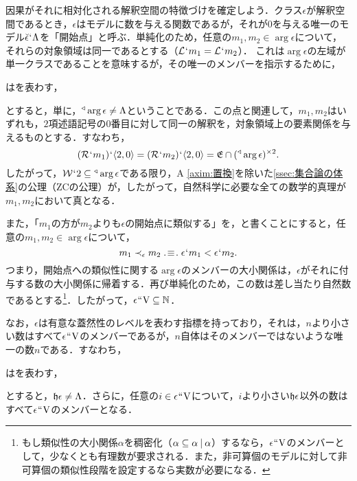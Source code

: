 因果がそれに相対化される解釈空間の特徴づけを確定しよう．クラス$\epsilon$が解釈空間であるとき，$\epsilon$はモデルに数を与える関数であるが，それが$0$を与える唯一のモデル$\breve{\epsilon}{\mspace{1mu}{`}\mspace{1mu}} \Lambda$を「開始点」と呼ぶ．単純化のため，任意の$m_1,m_2\in\arg\epsilon$について，それらの対象領域は同一であるとする（$\mathcal{L}{\mspace{1mu}{`}\mspace{1mu}} m_1 = \mathcal{L}{\mspace{1mu}{`}\mspace{1mu}} m_2$）．
これは$\arg\epsilon$の左域が単一クラスであることを意味するが，その唯一のメンバーを指示するために，
\begin{df}
\label{df:トライアングル}
\kagi{$
    \trgl{\alpha}
$}はを表わす，
\end{df}
\noindent とすると，単に，$ {^\triangleleft}\arg\epsilon\neq \Lambda $ということである．この点と関連して，$m_1,m_2$はいずれも，$2$項述語記号の$0$番目に対して同一の解釈を，対象領域上の要素関係を与えるものとする．すなわち，
\[
    (\mathcal{R}{\mspace{1mu}{`}\mspace{1mu}} m_1){\mspace{1mu}{`}\mspace{1mu}} \langle 2,0 \rangle = (\mathcal{R}{\mspace{1mu}{`}\mspace{1mu}} m_2){\mspace{1mu}{`}\mspace{1mu}} \langle 2,0 \rangle = \mathfrak{E}\cap({^\triangleleft}\arg\epsilon)^{\times 2}.
\]
したがって，$ \mathcal{W}{\mspace{1mu}{`}\mspace{1mu}} 2\subseteq{^\triangleleft}\arg\epsilon $である限り，A \ref{axim:置換}を除いた\ref{ssec:集合論の体系}の公理（ZCの公理）が，したがって，自然科学に必要な全ての数学的真理が$m_1,m_2$において真となる．

また，「$m_1$の方が$m_2$よりも$\epsilon$の開始点に類似する」を，と書くことにすると，任意の$m_1,m_2\in\arg\epsilon$について，
\[
   m_1 \prec_{\epsilon} m_2 \case{3}{1}{1} \epsilon\fap m_1 < \epsilon\fap m_2.
\]
つまり，開始点への類似性に関する$\arg\epsilon$のメンバーの大小関係は，$\epsilon$がそれに付与する数の大小関係に帰着する．再び単純化のため，この数は差し当たり自然数であるとする\footnote{
    もし類似性の大小関係$\alpha$を稠密化（$\alpha\subseteq\alpha\mathbin{\mid}\alpha$）するなら，$\epsilon{\mspace{1mu}{``}\mspace{1mu}}\mathrm{V}$のメンバーとして，少なくとも有理数が要求される．また，非可算個のモデルに対して非可算個の類似性段階を設定するなら実数が必要になる．
}．したがって，$\epsilon{\mspace{1mu}{``}\mspace{1mu}}\mathrm{V}\subseteq\mathbb{N}$．

なお，$\epsilon$は有意な蓋然性のレベルを表わす指標を持っており，それは，$n$より小さい数はすべて$\epsilon{\mspace{1mu}{``}\mspace{1mu}}\mathrm{V}$のメンバーであるが，$n$自体はそのメンバーではないような唯一の数$n$である．すなわち，
\begin{df}
\label{df:有意指標}
\kagi{$
    \indx{\epsilon}
$}はを表わす，
\end{df}
\noindent とすると，$\mathfrak{h}\epsilon\neq \Lambda$．さらに，任意の$i\in\epsilon{\mspace{1mu}{``}\mspace{1mu}}\mathrm{V}$について，$i$より小さい$\indx{\epsilon}$以外の数はすべて$\epsilon{\mspace{1mu}{``}\mspace{1mu}}\mathrm{V}$のメンバーとなる．

